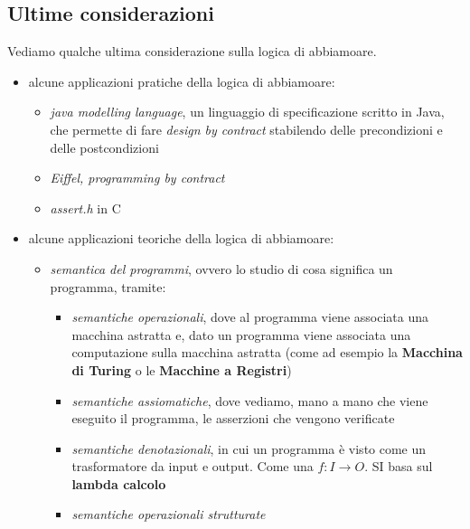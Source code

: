 				      					      			\subsection{Ultime considerazioni}
				      					      			Vediamo qualche ultima considerazione sulla logica di abbiamoare.
				      					      			\begin{itemize}
				      					      				\item alcune applicazioni pratiche della logica di abbiamoare:
				      					      				      \begin{itemize}
				      					      				      	\item \textit{java modelling language}, un linguaggio di specificazione
				      					      				      	      scritto in Java, che permette di fare \textit{design by contract} stabilendo
				      					      				      	      delle precondizioni e delle postcondizioni 
				      					      				      	\item \textit{Eiffel, programming by contract}
				      					      				      	\item \textit{assert.h} in C
				      					      				      \end{itemize}
				      					      				      				      					      				        
				      					      				\item alcune applicazioni teoriche della logica di abbiamoare:
				      					      				      \begin{itemize}
				      					      				      	\item \textit{semantica del programmi}, ovvero lo studio di cosa significa
				      					      				      	      un programma, tramite:
				      					      				      	      \begin{itemize}
				      					      				      	      	\item \textit{semantiche operazionali}, dove al programma
				      					      				      	      	      viene associata una macchina astratta e, dato un programma viene associata
				      					      				      	      	      una computazione sulla macchina astratta (come ad esempio la
				      					      				      	      	      \textbf{Macchina di Turing} o le \textbf{Macchine a Registri})
				      					      				      	      	\item \textit{semantiche assiomatiche}, dove vediamo, mano a mano che
				      					      				      	      	      viene eseguito il programma, le asserzioni che vengono verificate
				      					      				      	      	\item \textit{semantiche denotazionali}, in cui un programma è visto come
				      					      				      	      	      un trasformatore da input e output. Come una $f:I\to O$. SI basa sul
				      					      				      	      	      \textbf{lambda calcolo}
				      					      				      	      	\item \textit{semantiche operazionali strutturate}
				      					      				      	      \end{itemize}
				      					      				      \end{itemize}
				      					      			\end{itemize}
